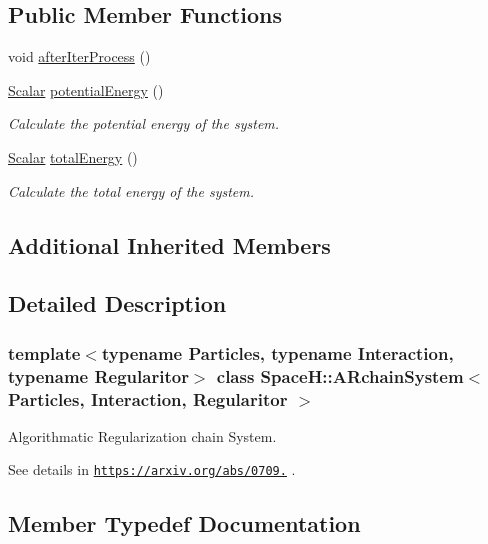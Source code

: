 \subsection*{Public Member Functions}
\begin{DoxyCompactItemize}
\item 
void \mbox{\hyperlink{class_space_h_1_1_a_rchain_system_a2a0f231485f166cf9037a06a4b83e8ca}{after\+Iter\+Process}} ()
\item 
\mbox{\hyperlink{class_space_h_1_1_a_rchain_system_acaaa03940944dd5d6978c575888dd308}{Scalar}} \mbox{\hyperlink{class_space_h_1_1_a_rchain_system_adf6a2220ead064e01251a74ecbd7eb41}{potential\+Energy}} ()
\begin{DoxyCompactList}\small\item\em Calculate the potential energy of the system. \end{DoxyCompactList}\item 
\mbox{\hyperlink{class_space_h_1_1_a_rchain_system_acaaa03940944dd5d6978c575888dd308}{Scalar}} \mbox{\hyperlink{class_space_h_1_1_a_rchain_system_a069b5ae075413b26fa177df689bf044d}{total\+Energy}} ()
\begin{DoxyCompactList}\small\item\em Calculate the total energy of the system. \end{DoxyCompactList}\end{DoxyCompactItemize}
\subsection*{Additional Inherited Members}


\subsection{Detailed Description}
\subsubsection*{template$<$typename Particles, typename Interaction, typename Regularitor$>$\newline
class Space\+H\+::\+A\+Rchain\+System$<$ Particles, Interaction, Regularitor $>$}

Algorithmatic Regularization chain System. 

See details in \href{https://arxiv.org/abs/0709.3367}{\tt https\+://arxiv.\+org/abs/0709.} . 

\subsection{Member Typedef Documentation}
\mbox{\label{class_space_h_1_1_a_rchain_system_a406ea4f9fd417879ac32c691bb705de4}} 
